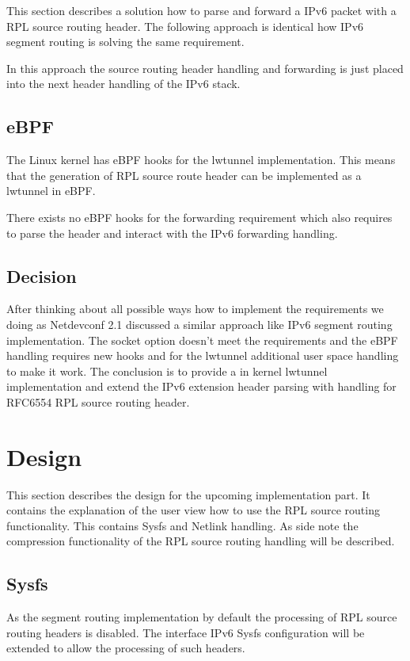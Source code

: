 \documentclass[letterpaper]{article}
\begin{document}
This section describes a solution how to parse and forward a IPv6 packet with a RPL source routing header.
The following approach is identical how IPv6 segment routing \cite{srh} is solving the same requirement.

In this approach the source routing header handling and forwarding is just placed into the next header handling of the IPv6 stack.

\subsection{eBPF}

The Linux kernel has eBPF hooks for the lwtunnel implementation.
This means that the generation of RPL source route header can be implemented as a lwtunnel in eBPF.

There exists no eBPF hooks for the forwarding requirement which also requires to parse the header and interact with the IPv6 forwarding handling.

\subsection{Decision}

After thinking about all possible ways how to implement the requirements we doing as Netdevconf 2.1 discussed a similar approach like IPv6 segment routing implementation.
The socket option doesn't meet the requirements and the eBPF handling requires new hooks and for the lwtunnel additional user space handling to make it work.
The conclusion is to provide a in kernel lwtunnel implementation and extend the IPv6 extension header parsing with handling for RFC6554 RPL source routing header.

\section{Design}

This section describes the design for the upcoming implementation part.
It contains the explanation of the user view how to use the RPL source routing functionality.
This contains Sysfs and Netlink handling.
As side note the compression functionality of the RPL source routing handling will be described.

\subsection{Sysfs}

As the segment routing implementation by default the processing of RPL source routing headers is disabled.
The interface IPv6 Sysfs configuration will be extended to allow the processing of such headers.
\end{document}
